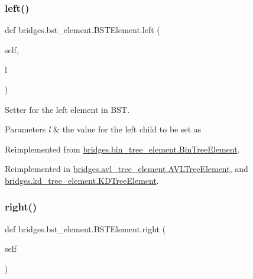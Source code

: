 \subsubsection{\texorpdfstring{left()}{left()}\hspace{0.1cm}{\footnotesize\ttfamily [2/2]}}
{\footnotesize\ttfamily def bridges.\+bst\+\_\+element.\+B\+S\+T\+Element.\+left (\begin{DoxyParamCaption}\item[{}]{self,  }\item[{}]{l }\end{DoxyParamCaption})}



Setter for the left element in B\+ST. 


\begin{DoxyParams}{Parameters}
{\em l} & the value for the left child to be set as \\
\hline
\end{DoxyParams}


Reimplemented from \mbox{\hyperlink{classbridges_1_1bin__tree__element_1_1_bin_tree_element_a29dc5b117c65774e756b46de45cd2f20}{bridges.\+bin\+\_\+tree\+\_\+element.\+Bin\+Tree\+Element}}.



Reimplemented in \mbox{\hyperlink{classbridges_1_1avl__tree__element_1_1_a_v_l_tree_element_a5ee29c8a42e07019a77ecd7a2534f8be}{bridges.\+avl\+\_\+tree\+\_\+element.\+A\+V\+L\+Tree\+Element}}, and \mbox{\hyperlink{classbridges_1_1kd__tree__element_1_1_k_d_tree_element_a784bad6511dae3a7c769672d2d3af14f}{bridges.\+kd\+\_\+tree\+\_\+element.\+K\+D\+Tree\+Element}}.

\mbox{\label{classbridges_1_1bst__element_1_1_b_s_t_element_a3ec82fbc56a5e6309b69d2d963b483fd}} 
\subsubsection{\texorpdfstring{right()}{right()}\hspace{0.1cm}{\footnotesize\ttfamily [1/2]}}
{\footnotesize\ttfamily def bridges.\+bst\+\_\+element.\+B\+S\+T\+Element.\+right (\begin{DoxyParamCaption}\item[{}]{self }\end{DoxyParamCaption})}




